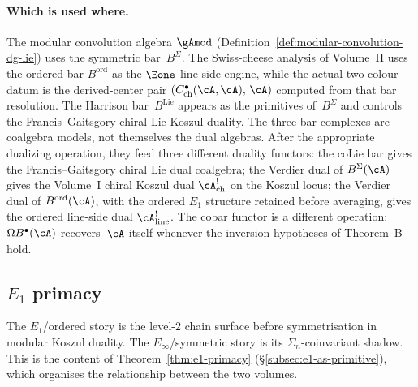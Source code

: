 \paragraph{Which is used where.}
The modular convolution algebra $\gAmod$
(Definition~\ref{def:modular-convolution-dg-lie}) uses the
symmetric bar~$B^\Sigma$. The
Swiss-cheese analysis of Volume~II uses the ordered bar
$B^{\mathrm{ord}}$ as the $\Eone$ line-side engine, while the
actual two-colour datum is the derived-center pair
$(C^\bullet_{\mathrm{ch}}(\cA,\cA),\,\cA)$ computed from that
bar resolution. The Harrison
bar~$B^{\mathrm{Lie}}$ appears as the primitives of~$B^\Sigma$
and controls the Francis--Gaitsgory chiral Lie Koszul duality.
The three bar complexes are coalgebra models, not themselves the
dual algebras. After the appropriate dualizing operation, they feed
three different duality functors: the coLie bar gives the
Francis--Gaitsgory chiral Lie dual coalgebra; the Verdier dual of
$B^\Sigma(\cA)$ gives the Volume~I chiral Koszul dual
$\cA^!_{\mathrm{ch}}$ on the Koszul locus; the Verdier dual of
$B^{\mathrm{ord}}(\cA)$, with the ordered $E_1$ structure retained
before averaging, gives the ordered line-side dual
$\cA^!_{\mathrm{line}}$. The cobar functor is a different operation:
$\Omega B^\bullet(\cA)$ recovers~$\cA$ itself whenever the inversion
hypotheses of Theorem~B hold.

\subsection{$E_1$ primacy}
\label{subsec:concordance-e1-primacy}

The $E_1$/ordered story is the level-$2$ chain surface before
symmetrisation in modular Koszul duality.
The $E_\infty$/symmetric story is its $\Sigma_n$-coinvariant shadow.
This is the content of
Theorem~\ref{thm:e1-primacy}
(\S\ref{subsec:e1-as-primitive}), which organises the relationship
between the two volumes.

